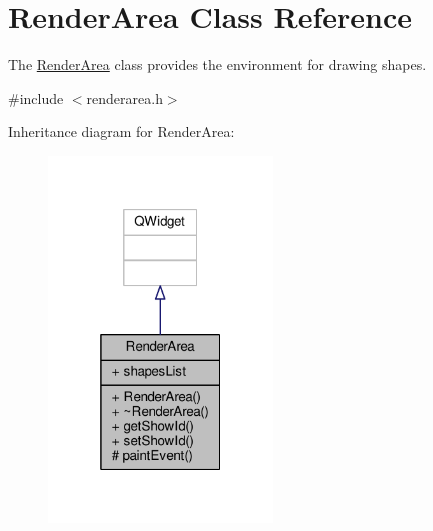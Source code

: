 \hypertarget{classRenderArea}{}\section{Render\+Area Class Reference}
\label{classRenderArea}


The \hyperlink{classRenderArea}{Render\+Area} class provides the environment for drawing shapes.  




{\ttfamily \#include $<$renderarea.\+h$>$}



Inheritance diagram for Render\+Area\+:\nopagebreak
\begin{figure}[H]
\begin{center}
\leavevmode
\includegraphics[width=169pt]{classRenderArea__inherit__graph}
\end{center}
\end{figure}


